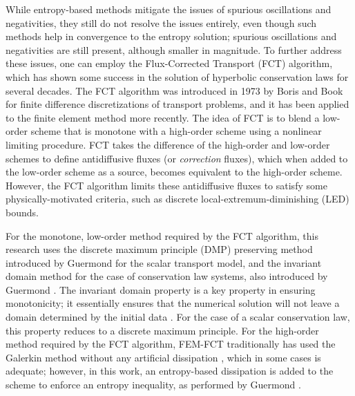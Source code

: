 While entropy-based methods mitigate the issues of spurious oscillations
and negativities, they still do not resolve the issues entirely, even
though such methods help in convergence to the entropy solution; spurious
oscillations and negativities are still present, although smaller in
magnitude. To further address these issues, one can employ the Flux-Corrected Transport (FCT)
algorithm, which has shown some success in the solution of hyperbolic
conservation laws for several decades.
The FCT algorithm was introduced in 1973 by Boris and Book \cite{borisbook} for
finite difference discretizations of transport problems, and it has
been applied to the finite element method more recently. The idea of FCT
is to blend a low-order scheme that is monotone with a high-order
scheme using a nonlinear limiting procedure. FCT takes the difference
of the high-order and low-order schemes to define antidiffusive
fluxes (or \emph{correction} fluxes), which when added to the low-order
scheme as a source, becomes equivalent to the high-order scheme. However,
the FCT algorithm limits these antidiffusive fluxes to satisfy some
physically-motivated criteria, such as discrete local-extremum-diminishing
(LED) bounds.

For the monotone, low-order method required by the FCT algorithm, this research
uses the discrete maximum principle (DMP) preserving method introduced by Guermond
\cite{guermond_firstorder} for the scalar transport model, and the invariant
domain method for the case of conservation law systems,
also introduced by Guermond \cite{guermond_invariantdomain}.
The invariant domain property is a key
property in ensuring monotonicity; it essentially ensures that the numerical
solution will not leave a domain determined by the initial data \cite{hoff_1985}.
For the case of a scalar conservation law, this property reduces to a discrete
maximum principle.
For the high-order method required by the FCT algorithm, FEM-FCT traditionally
has used the Galerkin method without any artificial dissipation \cite{kuzmin_FCT},
which in some cases is adequate; however, in
this work, an entropy-based dissipation is added to the scheme to enforce
an entropy inequality, as performed by Guermond
\cite{guermond_ev}\cite{guermond_secondorder}.

